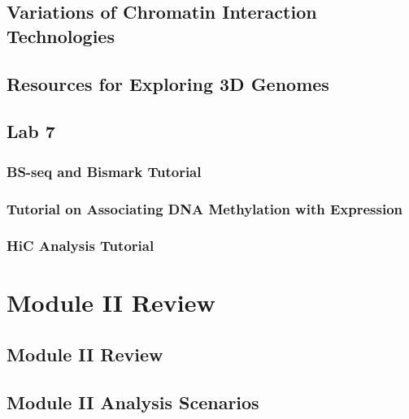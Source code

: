 \documentclass[
]{book}
\begin{document}
\hypertarget{variations-of-chromatin-interaction-technologies}{%
\section{Variations of Chromatin Interaction Technologies}\label{variations-of-chromatin-interaction-technologies}}

\hypertarget{resources-for-exploring-3d-genomes}{%
\section{Resources for Exploring 3D Genomes}\label{resources-for-exploring-3d-genomes}}

\hypertarget{lab-7}{%
\section{Lab 7}\label{lab-7}}

\hypertarget{bs-seq-and-bismark-tutorial}{%
\subsection{BS-seq and Bismark Tutorial}\label{bs-seq-and-bismark-tutorial}}

\hypertarget{tutorial-on-associating-dna-methylation-with-expression}{%
\subsection{Tutorial on Associating DNA Methylation with Expression}\label{tutorial-on-associating-dna-methylation-with-expression}}

\hypertarget{hic-analysis-tutorial}{%
\subsection{HiC Analysis Tutorial}\label{hic-analysis-tutorial}}

\hypertarget{m2re}{%
\chapter{Module II Review}\label{m2re}}

\hypertarget{module-ii-review}{%
\section{Module II Review}\label{module-ii-review}}

\hypertarget{module-ii-analysis-scenarios}{%
\section{Module II Analysis Scenarios}\label{module-ii-analysis-scenarios}}
\end{document}
